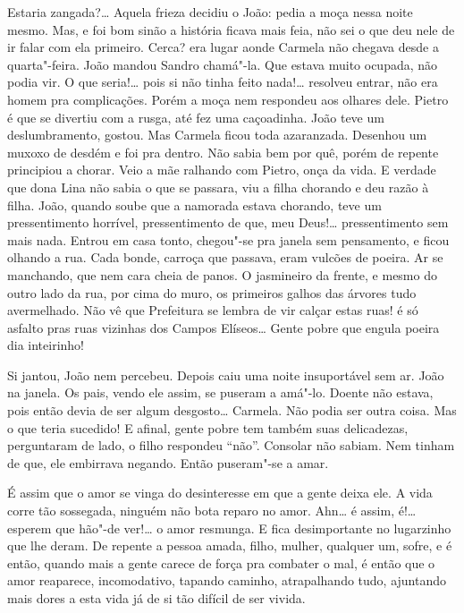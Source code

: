 Estaria zangada?\ldots{} Aquela frieza decidiu o João: pedia a moça nessa
noite mesmo. Mas, e foi bom sinão a história ficava mais feia, não sei o
que deu nele de ir falar com ela primeiro. Cerca? era lugar aonde
Carmela não chegava desde a quarta"-feira. João mandou Sandro chamá"-la.
Que estava muito ocupada, não podia vir. O que seria!\ldots{} pois si não
tinha feito nada!\ldots{} resolveu entrar, não era homem pra complicações.
Porém a moça nem respondeu aos olhares dele. Pietro é que se divertiu
com a rusga, até fez uma caçoadinha. João teve um deslumbramento,
gostou. Mas Carmela ficou toda azaranzada. Desenhou um muxoxo de desdém
e foi pra dentro. Não sabia bem por quê, porém de repente principiou a
chorar. Veio a mãe ralhando com Pietro, onça da vida. E verdade que dona
Lina não sabia o que se passara, viu a filha chorando e deu razão à
filha. João, quando soube que a namorada estava chorando, teve um
pressentimento horrível, pressentimento de que, meu Deus!\ldots{}
pressentimento sem mais nada. Entrou em casa tonto, chegou"-se pra janela
sem pensamento, e ficou olhando a rua. Cada bonde, carroça que passava,
eram vulcões de poeira. Ar se manchando, que nem cara cheia de panos. O
jasmineiro da frente, e mesmo do outro lado da rua, por cima do muro, os
primeiros galhos das árvores tudo avermelhado. Não vê que Prefeitura se
lembra de vir calçar estas ruas! é só asfalto pras ruas vizinhas dos
Campos Elíseos\ldots{} Gente pobre que engula poeira dia inteirinho!

Si jantou, João nem percebeu. Depois caiu uma noite insuportável sem ar.
João na janela. Os pais, vendo ele assim, se puseram a amá"-lo. Doente
não estava, pois então devia de ser algum desgosto\ldots{} Carmela. Não podia
ser outra coisa. Mas o que teria sucedido! E afinal, gente pobre tem
também suas delicadezas, perguntaram de lado, o filho respondeu ``não''.
Consolar não sabiam. Nem tinham de que, ele embirrava negando. Então
puseram"-se a amar.

É assim que o amor se vinga do desinteresse em que a gente deixa ele. A
vida corre tão sossegada, ninguém não bota reparo no amor. Ahn\ldots{} é
assim, é!\ldots{} esperem que hão"-de ver!\ldots{} o amor resmunga. E fica
desimportante no lugarzinho que lhe deram. De repente a pessoa amada,
filho, mulher, qualquer um, sofre, e é então, quando mais a gente carece
de força pra combater o mal, é então que o amor reaparece, incomodativo,
tapando caminho, atrapalhando tudo, ajuntando mais dores a esta vida já
de si tão difícil de ser vivida.

